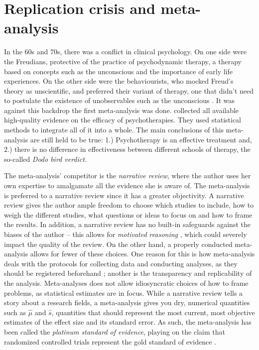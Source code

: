 \section{Replication crisis and meta-analysis}

In the 60s and 70s, there was a conflict in clinical psychology. On
one side were the Freudians, protective of the practice of psychodynamic
therapy, a therapy based on concepts such as the unconscious and the
importance of early life experiences. On the other side were the behaviourists,
who mocked Freud's theory as unscientific, and preferred their variant
of therapy, one that didn't need to postulate the existence of unobservables
such as the unconscious \parencite[Chapter 4]{wampold_basics_2010}. It
was against this backdrop the first meta-analysis was done. \cite{smith_meta-analysis_1977}
collected all available high-quality evidence on the efficacy of psychotherapies.
They used statistical methods to integrate all of it into a whole.
The main conclusions of this meta-analysis are still held to be true:
1.) Psychotherapy is an effective treatment and, 2.) there is no difference
in effectiveness between different schools of therapy, the so-called
\emph{Dodo bird verdict.}

The meta-analysis' competitor is the\emph{ narrative review}, where
the author uses her own expertise to amalgamate all the evidence she
is aware of. The meta-analysis is preferred to a narrative review
since it has a greater objectivity. A narrative review gives the author
ample freedom to choose which studies to include, how to weigh the
different studies, what questions or ideas to focus on and how to
frame the results. In addition, a narrative review has no built-in
safeguards against the biases of the author -- this allows for \emph{motivated
reasoning }\parencite{Kunda1990-ry}, which could severely impact
the quality of the review. On the other hand, a properly conducted
meta-analysis allows for fewer of these choices. One reason for this
is how meta-analysis deals with the protocols for collecting data
and conducting analyses, as they should be registered beforehand \parencite{Egger1997-ue};
another is the transparency and replicability of the analysis. Meta-analyses
does not allow idiosyncratic choices of how to frame problems, as
statistical estimates are in focus. While a narrative review tells
a story about a research fields, a meta-analysis gives you dry, numerical
quantities such as $\widehat{\mu}$ and $\widehat{s}$, quantities
that should represent the most current, most objective estimates of
the effect size and its standard error. As such, the meta-analysis
has been called the\emph{ platinum standard of evidence}, playing
on the claim that randomized controlled trials represent the gold
standard of evidence \parencite{Stegenga2011-zo}.


